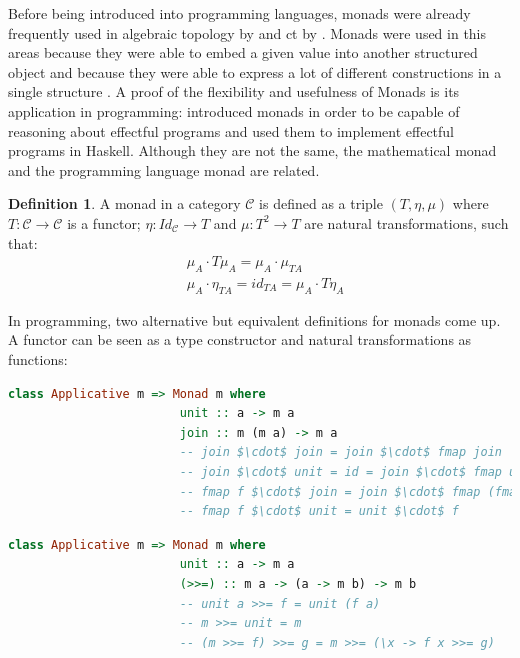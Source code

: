 \documentclass[
  oneside,
  11pt, a4paper,
  footinclude=true,
  headinclude=true,
  cleardoublepage=empty
]{scrbook}
\theoremstyle{definition}
\newtheorem{definition}{Definition}[section]
\theoremstyle{definition}
\begin{document}
	 Before being introduced into programming languages, monads were already frequently used in algebraic topology by \cite{godement1958topologie} and \gls{ct} by \cite{maclane:71}. Monads were used in this areas because they were able to embed a given value into another structured object and because they were able to express a lot of different constructions in a single structure \citep{DBLP:journals/corr/abs-1803-10195}. A proof of the flexibility and usefulness of Monads is its application in programming: \cite{Moggi:1991:NCM:116981.116984} introduced monads in order to be capable of reasoning about effectful programs and \cite{1995_wadler_monads} used them to implement effectful programs in Haskell. Although they are not the same, the mathematical monad and the programming language monad are related.
	            
	            \begin{definition}{A monad in a category $\mathscr{C}$ is defined as a triple $(T,\eta, \mu)$ where $T : \mathscr{C} \rightarrow \mathscr{C}$ is a functor; $\eta : Id_\mathscr{C} \rightarrow T$ and $\mu : T^2 \rightarrow T$ are natural transformations, such that:}
	                \begin{align*}
	                    &\mu_A \cdot T\mu_A = \mu_A \cdot \mu_{TA} \\
	                    &\mu_A \cdot \eta_{TA} = id_{TA} = \mu_A \cdot T\eta_A
	                \end{align*}{}
	            \end{definition}
	            
	            In programming, two alternative but equivalent definitions for monads come up. A functor can be seen as a type constructor and natural transformations as functions:
	            
	            \begin{lstlisting}[mathescape, language=Haskell, caption={Monad laws and definition in terms of \texttt{unit} and \texttt{join}},captionpos=b]
	                class Applicative m => Monad m where
	                    unit :: a -> m a
	                    join :: m (m a) -> m a
	                    -- join $\cdot$ join = join $\cdot$ fmap join
	                    -- join $\cdot$ unit = id = join $\cdot$ fmap unit
	                    -- fmap f $\cdot$ join = join $\cdot$ fmap (fmap f)
	                    -- fmap f $\cdot$ unit = unit $\cdot$ f
	            \end{lstlisting}{}
	            
	            \begin{lstlisting}[language=Haskell, caption={Monad laws and definition in terms of \texttt{unit} and \texttt{bind}},captionpos=b]
	                class Applicative m => Monad m where
	                    unit :: a -> m a
	                    (>>=) :: m a -> (a -> m b) -> m b
	                    -- unit a >>= f = unit (f a)
	                    -- m >>= unit = m
	                    -- (m >>= f) >>= g = m >>= (\x -> f x >>= g)
	            \end{lstlisting}{}
	            
\end{document}
